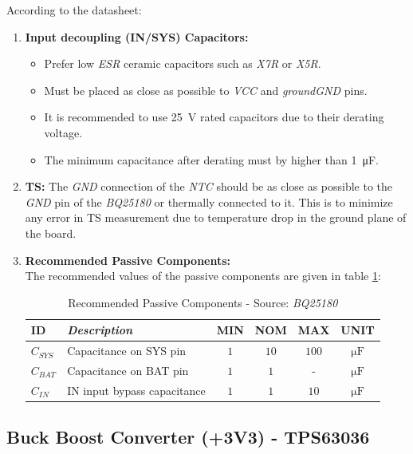 \documentclass[report.tex]{subfiles}
\begin{document}
According to the datasheet\cite{bq25180DS}:
\begin{enumerate}
\item \textbf{Input decoupling (IN/SYS) Capacitors:}
\begin{itemize}
\item Prefer low \textit{ESR} ceramic capacitors such as \textit{X7R} or \textit{X5R}.
\item Must be placed as close as possible to \textit{VCC} and \textit{groundGND} pins.
\item It is recommended to use \SI{25}{\volt} rated capacitors due to their derating voltage.
\item The minimum capacitance after derating must by higher than \SI{1}{\micro\farad}.
\end{itemize}
\item \textbf{TS:} The \textit{GND} connection of the \textit{NTC} should be as close as possible to the \textit{GND} pin of the \textit{BQ25180} or thermally connected to it. This is to minimize any error in TS measurement due to temperature drop in the ground plane of the board.
\item \textbf{Recommended Passive Components:}\\
The recommended values of the passive components are given in table \ref{tab:bq25180_recom_pass_comp}:
\begin{table}[H]
\centering
\begin{tabularx}{0.9\textwidth}{|l|X|c|c|c|c|}\hline
\textbf{ID} & \textit{Description} & \textbf{MIN} & \textbf{NOM} & \textbf{MAX} & \textbf{UNIT}\\\hline
$C_{SYS}$	& Capacitance on SYS pin & $1$ & $10$ & $100$ & $\si{\micro\farad}$\\\hline
$C_{BAT}$ 	& Capacitance on BAT pin & $1$ & $1$ & - & $\si{\micro\farad}$\\\hline
$C_{IN}$ 	& IN input bypass capacitance & $1$ & $1$ & $10$ & $\si{\micro\farad}$\\\hline
\end{tabularx}
\caption{Recommended Passive Components - Source: \textit{BQ25180}\cite{bq25180DS}}
\label{tab:bq25180_recom_pass_comp}
\end{table}
\end{enumerate}


\subsection{Buck Boost Converter (+3V3) - TPS63036}
\end{document}
